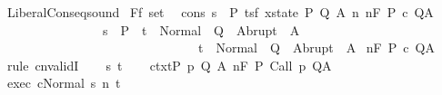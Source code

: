 \begin{isabellebody}
%
\endisatagproof
{\isafoldproof}%
%
\isadelimproof
%
\endisadelimproof
%
\isamarkuptrue%
%
\isamarkuptrue%
\isamarkupfalse%
\ LiberalConseq{\isacharunderscore}sound{\isacharcolon}\isanewline
{}\ F{\isacharcolon}{\isacharcolon}{\isachardoublequoteopen}{\isacharprime}f\ set{\isachardoublequoteclose}\ \isanewline
{}\ cons{\isacharcolon}\ {\isachardoublequoteopen}{\isasymforall}s\ {\isasymin}\ P{\isachardot}\ {\isasymforall}{\isacharparenleft}t{\isacharcolon}{\isacharcolon}{\isacharparenleft}{\isacharprime}s{\isacharcomma}{\isacharprime}f{\isacharparenright}\ xstate{\isacharparenright}{\isachardot}\ {\isasymexists}P{\isacharprime}\ Q{\isacharprime}\ A{\isacharprime}{\isachardot}\ {\isacharparenleft}{\isasymforall}n{\isachardot}\ {\isasymGamma}{\isacharcomma}{\isasymTheta}{\isasymTurnstile}n{\isacharcolon}\isactrlbsub {\isacharslash}F\isactrlesub \ P{\isacharprime}\ c\ Q{\isacharprime}{\isacharcomma}A{\isacharprime}{\isacharparenright}\ {\isasymand}\isanewline
\ \ \ \ \ \ \ \ \ \ \ \ \ \ \ \ {\isacharparenleft}{\isacharparenleft}s\ {\isasymin}\ P{\isacharprime}\ {\isasymlongrightarrow}\ t\ {\isasymin}\ Normal\ {\isacharbackquote}\ Q{\isacharprime}\ {\isasymunion}\ Abrupt\ {\isacharbackquote}\ A{\isacharprime}{\isacharparenright}\isanewline
\ \ \ \ \ \ \ \ \ \ \ \ \ \ \ \ \ \ \ \ \ \ \ \ \ \ \ \ \ \ {\isasymlongrightarrow}\ t\ {\isasymin}\ Normal\ {\isacharbackquote}\ Q\ {\isasymunion}\ Abrupt\ {\isacharbackquote}\ A{\isacharparenright}{\isachardoublequoteclose}\isanewline
{}\ {\isachardoublequoteopen}{\isasymGamma}{\isacharcomma}{\isasymTheta}{\isasymTurnstile}n{\isacharcolon}\isactrlbsub {\isacharslash}F\isactrlesub \ P\ c\ Q{\isacharcomma}A\ {\isachardoublequoteclose}\isanewline
%
\isadelimproof
%
\endisadelimproof
%
\isatagproof
{}\isamarkupfalse%
\ {\isacharparenleft}rule\ cnvalidI{\isacharparenright}\isanewline
\ \ \isamarkupfalse%
\ s\ t\isanewline
\ \ \isamarkupfalse%
\ ctxt{\isacharcolon}{\isachardoublequoteopen}{\isasymforall}{\isacharparenleft}P{\isacharcomma}\ p{\isacharcomma}\ Q{\isacharcomma}\ A{\isacharparenright}{\isasymin}{\isasymTheta}{\isachardot}\ {\isasymGamma}{\isasymTurnstile}n{\isacharcolon}\isactrlbsub {\isacharslash}F\isactrlesub \ P\ {\isacharparenleft}Call\ p{\isacharparenright}\ Q{\isacharcomma}A{\isachardoublequoteclose}\isanewline
\ \ \isamarkupfalse%
\ exec{\isacharcolon}\ {\isachardoublequoteopen}{\isasymGamma}{\isasymturnstile}{\isasymlangle}c{\isacharcomma}Normal\ s{\isasymrangle}\ {\isacharequal}n{\isasymRightarrow}\ t{\isachardoublequoteclose}\isanewline

\end{isabellebody}
